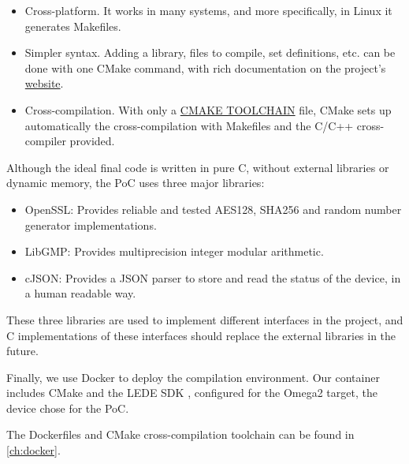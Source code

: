 \begin{itemize}
	\item Cross-platform. It works in many systems, and more specifically, in Linux it generates Makefiles.
	\item Simpler syntax. Adding a library, files to compile, set definitions, etc. can be done with one CMake command, with rich documentation on the project's \href{https://cmake.org/cmake/help/latest/}{website}.
	\item Cross-compilation. With only a \href{http://www.vtk.org/Wiki/CMake_Cross_Compiling#The_toolchain_file}{\small{CMAKE TOOLCHAIN}} file, CMake sets up automatically the cross-compilation with Makefiles and the C/C++ cross-compiler provided.
\end{itemize}


\hfil

Although the ideal final code is written in pure C, without external libraries or dynamic memory, the PoC uses three major libraries:

\begin{itemize}
	\item OpenSSL: Provides reliable and tested AES128, SHA256 and random number generator implementations.
	\item LibGMP: Provides multiprecision integer modular arithmetic.
	\item cJSON: Provides a JSON parser to store and read the status of the device, in a human readable way.
\end{itemize}

These three libraries are used to implement different interfaces in the project, and C implementations of these interfaces should replace the external libraries in the future.

\hfil

Finally, we use Docker to deploy the compilation environment. Our container includes CMake and the LEDE SDK \citep{ledeproject}, configured for the Omega2 target, the device chose for the PoC.

The Dockerfiles and CMake cross-compilation toolchain can be found in \autoref{ch:docker}.
